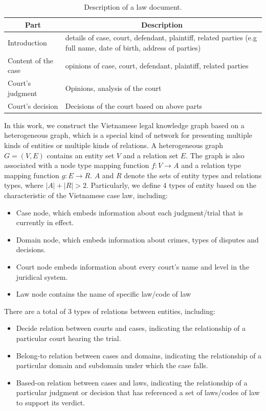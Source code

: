 \documentclass[conference]{IEEEtran}
\begin{document}
\begin{table}[ht]
\caption{Description of a law document.}
\label{tab:case structure}
\begin{tabular}{|p{2.5cm}|p{5.5cm}|}
\hline
\multicolumn{1}{|c|}{\textbf{Part}} & \multicolumn{1}{c|}{\textbf{Description}}                                                         \\ \hline
Introduction                  & details of case, court, defendant, plaintiff, related parties (e.g full name, date of birth, address of parties)      \\ \hline
Content of the case           & opinions of case, court, defendant, plaintiff, related parties      \\ \hline
Court's judgment & Opinions, analysis of the court \\ \hline
Court's decision & Decisions of the court based on above parts\\ \hline
\end{tabular}
\end{table}

In this work, we construct the Vietnamese legal knowledge graph based on a heterogeneous graph, which is a special kind of network for presenting multiple kinds of entities or multiple kinds of relations. A heterogeneous graph ${G = (V, E)}$ contains an entity set $V$ and a relation set $E$. The graph is also associated with a node type mapping function $f: V \rightarrow A$ and a relation type mapping function $g: E \rightarrow R$. $A$ and $R$ denote the sets of entity types and relations types, where $|A| + |R| > 2$.
Particularly, we define 4 types of entity based on the characteristic of the Vietnamese case law, including:
\begin{itemize}
    \item Case node, which embeds information about each judgment/trial that is currently in effect.
    \item Domain node, which embeds information about crimes, types of disputes and decisions.
    \item Court node embeds information about every court's name and level in the juridical system.
    \item Law node contains the name of specific law/code of law
\end{itemize}
There are a total of 3 types of relations between entities, including:
\begin{itemize}
    \item Decide relation between courts and cases, indicating the relationship of a particular court hearing the trial.
    \item Belong-to relation between cases and domains, indicating the relationship of a particular domain and subdomain under which the case falls.
    \item Based-on relation between cases and laws, indicating the relationship of a particular judgment or decision that has referenced a set of laws/codes of law to support its verdict.
\end{itemize}
\end{document}
